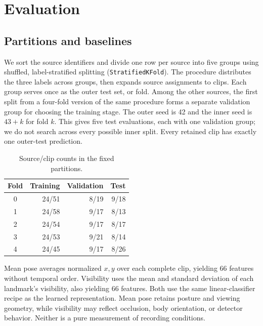 \documentclass[10pt,twocolumn,letterpaper]{article}
\begin{document}
\section{Evaluation}
\subsection{Partitions and baselines}
We sort the source identifiers and divide one row per source into five groups using shuffled, label-stratified splitting (\texttt{StratifiedKFold}). The procedure distributes the three labels across groups, then expands source assignments to clips. Each group serves once as the outer test set, or fold. Among the other sources, the first split from a four-fold version of the same procedure forms a separate validation group for choosing the training stage. The outer seed is 42 and the inner seed is $43+k$ for fold $k$. This gives five test evaluations, each with one validation group; we do not search across every possible inner split. Every retained clip has exactly one outer-test prediction.

\begin{table}[t]
\centering
\caption{Source/clip counts in the fixed partitions.}
\label{tab:splits}
\begin{tabular}{crrr}
\toprule
Fold & Training & Validation & Test\\
\midrule
0&24/51&8/19&9/18\\
1&24/58&9/17&8/13\\
2&24/54&9/17&8/17\\
3&24/53&9/21&8/14\\
4&24/45&9/17&8/26\\
\bottomrule
\end{tabular}
\end{table}

Mean pose averages normalized $x,y$ over each complete clip, yielding 66 features without temporal order. Visibility uses the mean and standard deviation of each landmark's visibility, also yielding 66 features. Both use the same linear-classifier recipe as the learned representation. Mean pose retains posture and viewing geometry, while visibility may reflect occlusion, body orientation, or detector behavior. Neither is a pure measurement of recording conditions.
\end{document}
